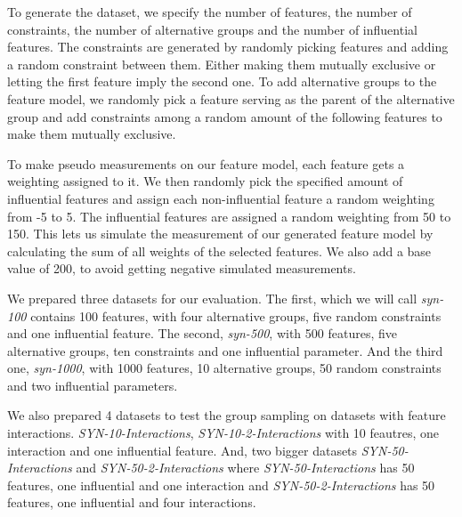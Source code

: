 \documentclass[../../thesis.tex]{subfiles}
\begin{document}
To generate the dataset, we specify the number of features, the number of constraints, the number of
alternative groups and the number of influential features. The constraints are generated by
randomly picking features and adding a random constraint between them. Either making them
mutually exclusive or letting the first feature imply the second one.
To add alternative groups to the feature model, we randomly pick a feature serving as the parent
of the alternative group and add constraints among a random amount of the following features to make them
mutually exclusive.

To make pseudo measurements on our feature model, each feature gets a weighting assigned to it.
We then randomly pick the specified amount of influential features and assign each non-influential feature
a random weighting from -5 to 5. The influential features are assigned a random weighting from
50 to 150. This lets us simulate the measurement of our generated feature model
by calculating the sum of all weights of the selected features. We also add a base value
of 200, to avoid getting negative simulated measurements.

We prepared three datasets for our evaluation.
The first, which we will call \textit{syn-100} contains 100 features, with four alternative groups, five random
constraints and one influential feature. The second, \textit{syn-500}, with 500 features, five alternative groups,
ten constraints and one influential parameter. And the third one, \textit{syn-1000}, with 1000 features, 10 alternative groups,
50 random constraints and two influential parameters.

We also prepared 4 datasets to test the group sampling on datasets with feature interactions. 
\textit{SYN-10-Interactions}, \textit{SYN-10-2-Interactions} with 10 feautres, one interaction and one influential feature.
And, two bigger datasets \textit{SYN-50-Interactions} and \textit{SYN-50-2-Interactions} where \textit{SYN-50-Interactions}
has 50 features, one influential and one interaction and \textit{SYN-50-2-Interactions} has 50 features, one influential and four interactions.

\newpage
\end{document}
